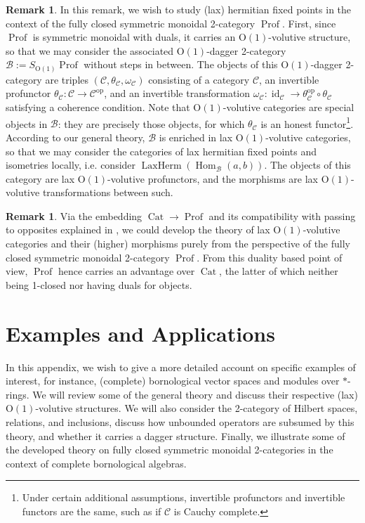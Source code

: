 \documentclass{article}
\newcommand{\Prof}{\operatorname{Prof}}%
\newcommand{\opp}{\operatorname{op}}%
\newcommand{\id}{\operatorname{id}}%
\newcommand{\Cat}{\operatorname{Cat}}%
\newcommand{\Hom}{\operatorname{Hom}}%
\newcommand{\LaxHerm}{\operatorname{LaxHerm}}%
\newcommand{\Oone}{\operatorname{O(1)}}
\newcommand{\B}{\mathcal{B}}
\newcommand{\C}{\mathcal{C}}
\numberwithin{equation}{section}
\theoremstyle{definition}
\newtheorem{remark}[definition]{Remark}
\theoremstyle{theorem}
\begin{document}
\begin{remark}
    In this remark, we wish to study (lax) hermitian fixed points in the context of the fully closed symmetric monoidal 2-category $\Prof$.
    First, since $\Prof$ is symmetric monoidal with duals, it carries an $\Oone$-volutive structure, so that we may consider the associated 
    $\Oone$-dagger 2-category $\B := S_{\Oone}\Prof$ without steps in between. The objects of this $\Oone$-dagger 2-category are triples 
    $(\C,\theta_{\C},\omega_{\C})$ consisting of a category $\C$, an invertible profunctor $\theta_{\C} \colon \C \to \C^{\opp}$, and an invertible 
    transformation $\omega_{\C} \colon \id_{\C} \to \theta_{\C}^{\opp} \circ \theta_{\C}$ satisfying a coherence condition. Note that $\Oone$-volutive 
    categories are special objects in $\B$: they are precisely those objects, for which $\theta_{\C}$ is an honest functor\footnote{Under certain additional 
    assumptions, invertible profunctors and invertible functors are the same, such as if $\C$ is Cauchy complete.}.\\
    According to our general theory, $\B$ is enriched in lax $\Oone$-volutive categories, so that we may consider the categories of lax hermitian fixed 
    points and isometries locally, i.e. consider $\LaxHerm(\Hom_{\B}(a,b))$. The objects of this category are lax $\Oone$-volutive profunctors, and the 
    morphisms are lax $\Oone$-volutive transformations between such. 
\end{remark}
\begin{remark}
    Via the embedding $\Cat \to \Prof$ and its compatibility with passing to opposites explained in ,
    we could develop the theory of lax $\Oone$-volutive categories and their (higher) morphisms purely from the perspective of the fully closed symmetric 
    monoidal 2-category $\Prof$. From this duality based point of view, $\Prof$ hence carries an advantage over $\Cat$, the latter of which neither 
    being 1-closed nor having duals for objects. 
\end{remark}

\section{Examples and Applications}\label{Appendix: supplementary background material}
In this appendix, we wish to give a more detailed account on specific examples of interest, for instance, (complete) bornological vector spaces and modules over $*$-rings.
We will review some of the general theory and discuss their respective (lax) $\Oone$-volutive structures. We will also consider the 2-category of 
Hilbert spaces, relations, and inclusions, discuss how unbounded operators are subsumed by this theory, and whether it carries a dagger structure. 
Finally, we illustrate some of the developed theory on fully closed symmetric monoidal 2-categories in the context of complete bornological algebras. 
\end{document}

